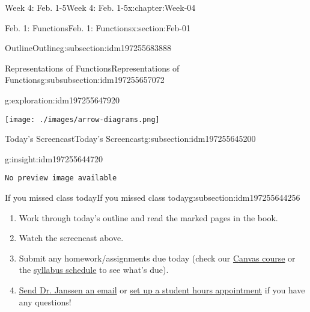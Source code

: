 \documentclass[oneside,10pt,]{book}
\newcommand{\mono}[1]{\texttt{#1}}
\numberwithin{equation}{section}
\newlength{\qrsize}
\newlength{\previewwidth}
\begin{document}
\begin{chapterptx}{Week 4: Feb. 1-5}{}{Week 4: Feb. 1-5}{}{}{x:chapter:Week-04}
\begin{sectionptx}{Feb. 1: Functions}{}{Feb. 1: Functions}{}{}{x:section:Feb-01}
\begin{subsectionptx}{Outline}{}{Outline}{}{}{g:subsection:idm197255683888}
\begin{subsubsectionptx}{Representations of Functions}{}{Representations of Functions}{}{}{g:subsubsection:idm197255657072}
\begin{exploration}{}{g:exploration:idm197255647920}
\begin{image}{0.1}{0.8}{0.1}%
\texttt{[image: ./images/arrow-diagrams.png]}
\end{image}%
\end{exploration}%
\end{subsubsectionptx}
\end{subsectionptx}
%
%
\typeout{************************************************}
\typeout{************************************************}
%
\begin{subsectionptx}{Today's Screencast}{}{Today's Screencast}{}{}{g:subsection:idm197255645200}
\begin{insight}{}{g:insight:idm197255644720}%
\setlength{\qrsize}{9em}
\setlength{\previewwidth}{\linewidth}
\addtolength{\previewwidth}{-\qrsize}
\begin{tcbraster}[raster columns=2, raster column skip=1pt, raster halign=center, raster force size=false, raster left skip=0pt, raster right skip=0pt]%
\begin{tcolorbox}[previewstyle, width=\previewwidth]%
\mono{No preview image available}%
\end{tcolorbox}%
\begin{tcolorbox}[qrstyle]%
[QR LINK]\end{tcolorbox}%
\end{tcbraster}%
\end{insight}
\end{subsectionptx}
%
%
\typeout{************************************************}
\typeout{************************************************}
%
\begin{subsectionptx}{If you missed class today}{}{If you missed class today}{}{}{g:subsection:idm197255644256}
%
\begin{enumerate}
\item{}Work through today's outline and read the marked pages in the book.%
\item{}Watch the screencast above.%
\item{}Submit any homework\slash{}assignments due today (check our \href{https://dordt.instructure.com/courses/3110050}{Canvas course} or the \href{https://prof.mkjanssen.org/ds/index.html\#schedule}{syllabus schedule} to see what's due).%
\item{}\href{mailto:mike.janssen@dordt.edu}{Send Dr. Janssen an email} or \href{https://calendly.com/mkjanssen/student-hours}{set up a student hours appointment} if you have any questions!%

\end{enumerate}
\end{subsectionptx}
\end{sectionptx}
\end{chapterptx}
\end{document}
